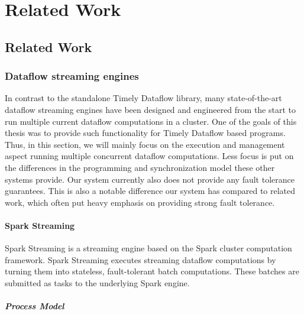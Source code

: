 \chapter{Related Work} \label{ch:related}

\section{Related Work}

\subsection{Dataflow streaming engines}

In contrast to the standalone Timely Dataflow library, many state-of-the-art
dataflow streaming engines have been designed and engineered from the start
to run multiple current dataflow computations in a cluster. One of the
goals of this thesis was to provide such functionality for Timely Dataflow
based programs. Thus, in this section, we will mainly focus on the execution
and management aspect running multiple concurrent dataflow computations. Less focus is
put on the differences in the programming and synchronization model these 
other systems provide. Our system currently also does not provide any fault
tolerance guarantees. This is also a notable difference our system has compared
to related work, which often put heavy emphasis on providing strong fault
tolerance.

\subsubsection{Spark Streaming}

Spark Streaming \cite{sparkstreaming} is a streaming engine based on the Spark
cluster computation framework. Spark Streaming executes streaming dataflow
computations by turning them into stateless, fault-tolerant batch computations.
These batches are submitted as tasks to the underlying Spark engine. \cite{spark} 

\paragraph{Process Model}

